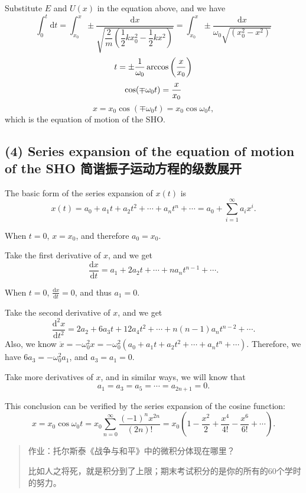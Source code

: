 Substitute \(E\) and \(U(x)\) in the equation above, and we have
\[\int_{0}^{t} \mathrm{d}t = \int_{x_0}^{x} \pm \frac{\mathrm{d}x}{\sqrt{\dfrac{2}{m}\left( \dfrac{1}{2} k x_0^2 - \dfrac{1}{2} k x^2 \right)}} = \int_{x_0}^{x} \pm \frac{\mathrm{d}x}{\omega_0 \sqrt{\left( x_0^2 - x^2 \right)}}\]
\[t = \pm {1 \over \omega_0} \arccos \left( {x \over x_0} \right)\]
\[\cos (\mp \omega_0 t) = {x \over x_0}\]
\[x = x_0 \cos \left( \mp \omega_0 t \right) = x_0 \cos \omega_0 t,\]
which is the equation of motion of the SHO.

\subsection*{(4) Series expansion of the equation of motion of the SHO
简谐振子运动方程的级数展开}\label{series-expansion-of-the-equation-of-motion-of-the-sho-ux7b80ux8c10ux632fux5b50ux8fd0ux52a8ux65b9ux7a0bux7684ux7ea7ux6570ux5c55ux5f00}

The basic form of the series expansion of \(x(t)\) is
\[x(t) = a_0 + a_1 t + a_2 t^2 + \cdots + a_n t^n + \cdots = a_0 + \sum_{i = 1}^{\infty} a_i x^i.\]

When \(t = 0\), \(x = x_0\), and therefore \(a_0 = x_0\).

Take the first derivative of \(x\), and we get
\[\frac{\mathrm{d}x}{\mathrm{d}t} = a_1 + 2a_2 t + \cdots + n a_n t^{n - 1} + \cdots.\]

When \(t = 0\), \(\displaystyle \frac{\mathrm{d}x}{\mathrm{d}t} = 0\),
and thus \(a_1 = 0\).

Take the second derivative of \(x\), and we get
\[\frac{\mathrm{d}^2x}{\mathrm{d}t^2} = 2a_2 + 6 a_3 t + 12 a_4 t^2 + \cdots + n(n - 1) a_n t^{n - 2} + \cdots.\]
Also, we know
\(\ddot{x} = - \omega_0^2 x = - \omega_0^2 \left( a_0 + a_1 t + a_2 t^2 + \cdots + a_n t^n + \cdots \right)\).
Therefore, we have \(6a_3 = - \omega_0^2 a_1\), and \(a_3 = a_1 = 0\).

Take more derivatives of \(x\), and in similar ways, we will know that
\[a_1 = a_3 = a_5 = \cdots = a_{2n + 1} = 0.\]

This conclusion can be verified by the series expansion of the cosine
function:
\[x = x_0 \cos \omega_0 t = x_0 \sum_{n = 0}^{\infty} \frac{(-1)^n x^{2n}}{(2n)!} = x_0 \left( 1 - \frac{x^2}{2} + \frac{x^4}{4!} - \frac{x^6}{6!} + \cdots \right).\]

\begin{quote}
作业：托尔斯泰《战争与和平》中的微积分体现在哪里？

比如人之将死，就是积分到了上限；期末考试积分的是你的所有的60个学时的努力。
\end{quote}

